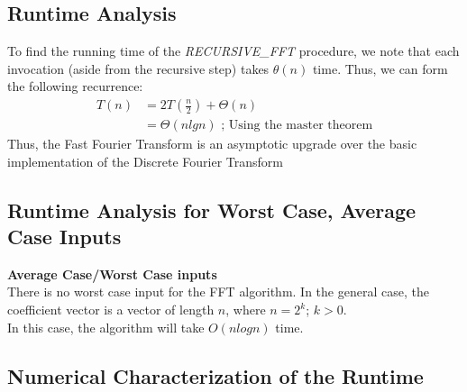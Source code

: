 \documentclass{article}
\begin{document}
\subsection{Runtime Analysis}
To find the running time of the \textit{RECURSIVE\_FFT} procedure, we note that each invocation (aside from the recursive step) takes $\theta(n)$ time. Thus, we can form the following recurrence: \\
\begin{align*}
T(n)&=2T(\frac{n}{2})+\Theta(n) \\
&=\Theta(nlgn) \text{ ; Using the master theorem}
\end{align*}
Thus, the Fast Fourier Transform is an asymptotic upgrade over the basic implementation of the Discrete Fourier Transform

\subsection{Runtime Analysis for Worst Case, Average Case Inputs}
\textbf{Average Case/Worst Case inputs} \\
There is no worst case input for the FFT algorithm. In the general case, the coefficient vector is a vector of length $n$, where $n=2^{k}$; $k>0$. \\
In this case, the algorithm will take $O(nlogn)$ time.

\subsection{Numerical Characterization of the Runtime}
\end{document}
